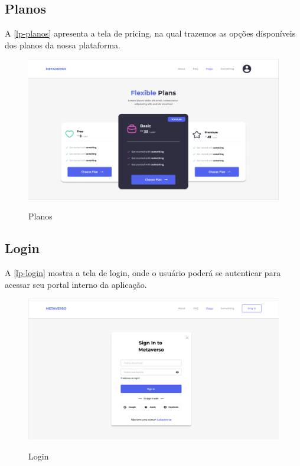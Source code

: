 \subsection{Planos} 
    A \autoref{lp-planos} apresenta a tela de pricing, na qual trazemos as opções disponíveis dos planos da nossa plataforma.
    \begin{figure}[!h]
        \caption{Planos}
        \centering %
        \label{lp-planos}
        \includegraphics[width=15cm]{LaTeX/metaversoIFSP/anexos/plans.png} %
    \end{figure}
\newpage
\subsection{Login} 
    A \autoref{lp-login} mostra a tela de login, onde o usuário poderá se autenticar para acessar seu portal interno da aplicação.
    \begin{figure}[h]
        \caption{Login}
        \centering %
        \label{lp-login}
        \includegraphics[width=15cm]{LaTeX/metaversoIFSP/anexos/login.png} %
    \end{figure}
    

